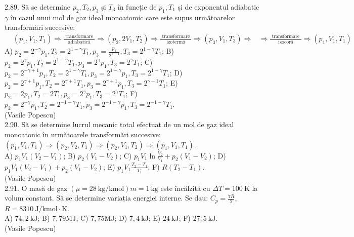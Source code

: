 2.89. Să se determine $p_{2}, T_{2}, p_{3}$ și $T_{3}$ în funcție de $p_{1}, T_{1}$ și de exponentul adiabatic $\gamma$ în cazul unui mol de gaz ideal monoatomic care este supus următoarelor transformări succesive: $\begin{aligned}& \left(p_{1}, V_{1}, T_{1}\right) \Rightarrow \frac{\text { transformare }}{\text { adiabatică }} \Rightarrow\left(p_{2}, 2 V_{1}, T_{2}\right) \Rightarrow \frac{\text { transformare }}{\text { izotermă }} \Rightarrow\left(p_{3}, V_{1}, T_{3}\right) \Rightarrow & \Rightarrow \frac{\text { transformare }}{\text { izocoră }} \Rightarrow\left(p_{1}, V_{1}, T_{1}\right) \end{aligned}$\\ A) $p_{2}=2^{-\gamma} p_{1}, T_{2}=2^{1-\gamma} T_{1}, p_{3}=\frac{p_{1}}{2^{\gamma-1}}, T_{3}=2^{1-\gamma} T_{1}$; B) $p_{2}=2^{\gamma} p_{1}, T_{2}=2^{1-\gamma} T_{1}, p_{3}=2^{\gamma} p_{1}, T_{3}=2^{\gamma} T_{1}$; C) $p_{2}=2^{-\gamma+1} p_{1}, T_{2}=2^{1-\gamma} T_{1}, p_{3}=2^{1-\gamma} p_{1}, T_{3}=2^{1-\gamma} T_{1}$; D) $p_{2}=2^{\gamma+1} p_{1}, T_{2}=2^{\gamma+1} T_{1}, p_{3}=2^{\gamma+1} p_{1}, T_{3}=2^{\gamma+1} T_{1}$; E) $p_{2}=2 p_{1}, T_{2}=2 T_{1}, p_{3}=2^{\gamma} p_{1}, T_{3}=2^{\gamma} T_{1}$; F) $p_{2}=2^{-\gamma} p_{1}, T_{2}=2^{-1-\gamma} T_{1}, p_{3}=2^{-1-\gamma} p_{1}, T_{3}=2^{-1-\gamma} T_{1}$.\\ (Vasile Popescu)\\

2.90. Să se determine lucrul mecanic total efectuat de un mol de gaz ideal monoatonic în următoarele transformări succesive: $ \left(p_{1}, V_{1}, T_{1}\right) \Rightarrow\left(p_{2}, V_{2}, T_{1}\right) \Rightarrow\left(p_{2}, V_{1}, T_{2}\right) \Rightarrow\left(p_{1}, V_{1}, T_{1}\right)$.\\ A) $p_{1} V_{1}\left(V_{2}-V_{1}\right)$; B) $p_{2}\left(V_{1}-V_{2}\right)$; C) $p_{1} V_{1} \ln \frac{V_{2}}{V_{1}}+p_{2}\left(V_{1}-V_{2}\right)$; D) $p_{1} V_{1}\left(V_{2}-V_{1}\right)+p_{2}\left(V_{1}-V_{2}\right)$; E) $p_{1} V_{1} \frac{T_{2}-T_{1}}{T_{1}}$; F) $R\left(T_{2}-T_{1}\right)$.\\ (Vasile Popescu)\\

2.91. O masă de gaz $(\mu=28 \mathrm{~kg} / \mathrm{kmol}) m=1 \mathrm{~kg}$ este încălzită cu $\Delta T=100 \mathrm{~K}$ la volum constant. Să se determine variația energiei interne. Se dau: $C_{p}=\frac{7 R}{2}$, $R=8310 \mathrm{~J} / \mathrm{kmol} \cdot \mathrm{K}$.\\ A) $74,2 \mathrm{~kJ}$; B) $7,79 \mathrm{MJ}$; C) $7,75 \mathrm{MJ}$; D) $7,4 \mathrm{~kJ}$; E) $24 \mathrm{~kJ}$; F) $27,5 \mathrm{~kJ}$.\\ (Vasile Popescu)\\

